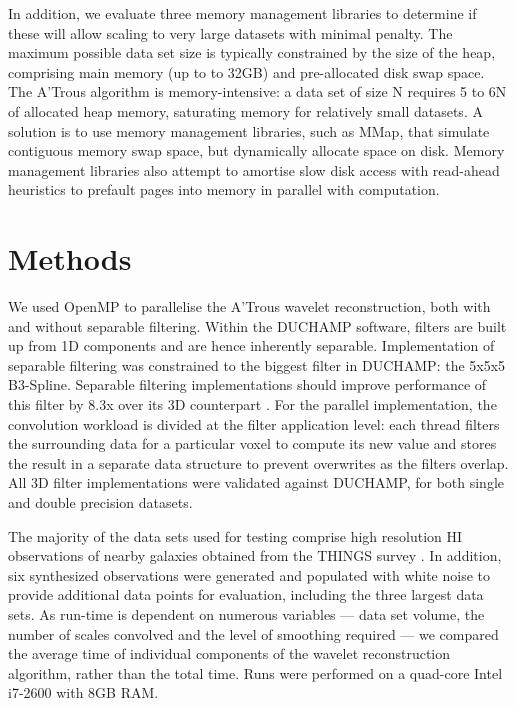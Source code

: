 In addition, we evaluate three memory management libraries to determine if these will allow scaling to very large datasets with minimal penalty.
The maximum possible data set size is typically constrained by the size of the heap, comprising main memory (up to to 32GB) and pre-allocated disk swap space.  The A'Trous algorithm is memory-intensive: a data set of size N requires 5 to 6N of allocated heap memory, saturating memory for relatively small datasets.
A solution  is to use memory management libraries, such as MMap\citep{mmap2012},
that simulate contiguous memory swap space, but dynamically allocate space on disk.
Memory management libraries also attempt to amortise slow disk access with read-ahead heuristics to prefault pages into memory in parallel with computation.

\section{Methods}

We used OpenMP to parallelise the  A'Trous wavelet reconstruction, both with and without separable filtering.  Within the DUCHAMP software, filters are built up from 1D components and are hence inherently separable.  Implementation of separable filtering was constrained to the biggest filter in DUCHAMP: the  5x5x5 B3-Spline.
Separable filtering implementations should  improve performance of this filter by 8.3x over its 3D counterpart \citep{Solomon2010}.
For the parallel implementation, the convolution workload is divided at the filter application level: each  thread filters the surrounding data for a particular voxel to compute its new value and stores the result in
a separate data structure to prevent overwrites as the filters overlap.  All  3D filter implementations were validated against  DUCHAMP, for both single and double precision datasets.

The majority of the data sets used for testing comprise high resolution HI observations of nearby galaxies obtained from the THINGS survey \citep{Walter2008}.
In addition, six synthesized observations were generated and populated with white noise to provide additional data points for evaluation, including the three largest data sets. As run-time is dependent on numerous variables ---  data set volume, the number of scales convolved  and the level of smoothing required ---
we compared the average time of  individual components of the wavelet reconstruction algorithm, rather than the total time.  Runs were performed on a quad-core Intel i7-2600 with 8GB RAM.

